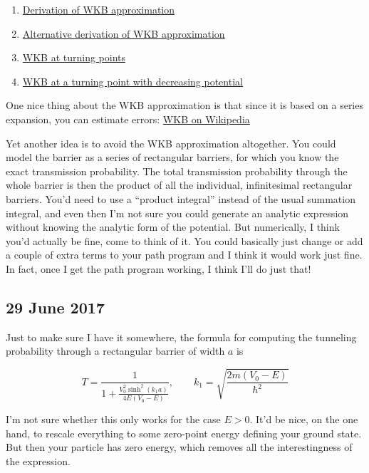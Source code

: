 \documentclass[]{report}
\begin{document}
\begin{enumerate}
\item \href{http://www.physicspages.com/2014/07/03/wkb-approximation-tunneling/}{Derivation of WKB approximation}
\item \href{http://www.physicspages.com/2014/06/30/wkb-approximation-alternative-derivation/}{Alternative derivation of WKB approximation}
\item \href{http://www.physicspages.com/2014/07/09/wkb-approximation-turning-points/}{WKB at turning points}
\item \href{http://www.physicspages.com/2014/07/14/wkb-approximation-at-a-turning-point-with-decreasing-potential/}{WKB at a turning point with decreasing potential}
\end{enumerate}

\noindent One nice thing about the WKB approximation is that since it is based on a series expansion, you can estimate errors: \href{https://en.wikipedia.org/wiki/WKB_approximation#Precision_of_the_asymptotic_series}{WKB on Wikipedia}

Yet another idea is to avoid the WKB approximation altogether. You could model the barrier as a series of rectangular barriers, for which you know the exact transmission probability. The total transmission probability through the whole barrier is then the product of all the individual, infinitesimal rectangular barriers. You'd need to use a ``product integral'' instead of the usual summation integral, and even then I'm not sure you could generate an analytic expression without knowing the analytic form of the potential. But numerically, I think you'd actually be fine, come to think of it. You could basically just change or add a couple of extra terms to your path program and I think it would work just fine. In fact, once I get the path program working, I think I'll do just that!

\subsection*{29 June 2017}
Just to make sure I have it somewhere, the formula for computing the tunneling probability through a rectangular barrier of width $a$ is

\begin{equation}
T = \frac{1}{1+\frac{V_0^2\sinh^2(k_1a)}{4E(V_0-E)}}, \qquad k_1 = \sqrt{\frac{2m(V_0-E)}{\hbar^2}}
\end{equation}

I'm not sure whether this only works for the case $E>0$. It'd be nice, on the one hand, to rescale everything to some zero-point energy defining your ground state. But then your particle has zero energy, which removes all the interestingness of the expression.
\end{document}
